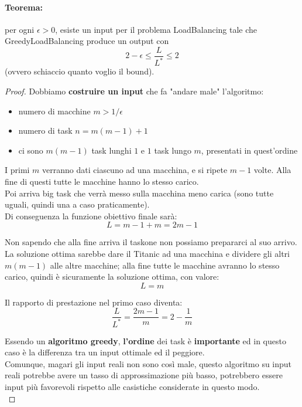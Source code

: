 \paragraph{Teorema:} per ogni $\epsilon > 0$, esiste un input per il problema LoadBalancing tale che GreedyLoadBalancing produce un output con 
$$ 2 - \epsilon \leq \frac{L}{L^\ast} \leq 2$$
(ovvero schiaccio quanto voglio il bound).\\

\begin{proof}
	Dobbiamo \textbf{costruire un input} che fa "andare male" l'algoritmo:
	\begin{itemize}
		\item numero di macchine $m > 1/ \epsilon$
		\item numero di task $n = m(m-1)+1$
		\item ci sono $m(m-1)$ task lunghi $1$ e $1$ task lungo $m$, presentati in quest'ordine
	\end{itemize}
	
	I primi $m$ verranno dati ciascuno ad una macchina, e si ripete $m-1$ volte. Alla fine di questi tutte le macchine hanno lo stesso carico.\\
	Poi arriva big task che verrà messo sulla macchina meno carica (sono tutte uguali, quindi una a caso praticamente).\\
	
	Di conseguenza la funzione obiettivo finale sarà:
	$$ L = m - 1 + m = 2m - 1 $$
	
	Non sapendo che alla fine arriva il taskone non possiamo prepararci al suo arrivo. La soluzione ottima sarebbe dare il Titanic ad una macchina e dividere gli altri $m(m-1)$ alle altre macchine; alla fine tutte le macchine avranno lo stesso carico, quindi è sicuramente la soluzione ottima, con valore:
	$$ L = m $$
	
	Il rapporto di prestazione nel primo caso diventa:
	$$ \frac{L}{L^\ast} = \frac{2m-1}{m} = 2 - \frac{1}{m} $$
	
	Essendo un \textbf{algoritmo greedy}, \textbf{l'ordine} dei task è \textbf{importante} ed in questo caso è la differenza tra un input ottimale ed il peggiore.\\
	
	Comunque, magari gli input reali non sono così male, questo algoritmo su input reali potrebbe avere un tasso di approssimazione più basso, potrebbero essere input più favorevoli rispetto alle casistiche considerate in questo modo.\\
\end{proof}

